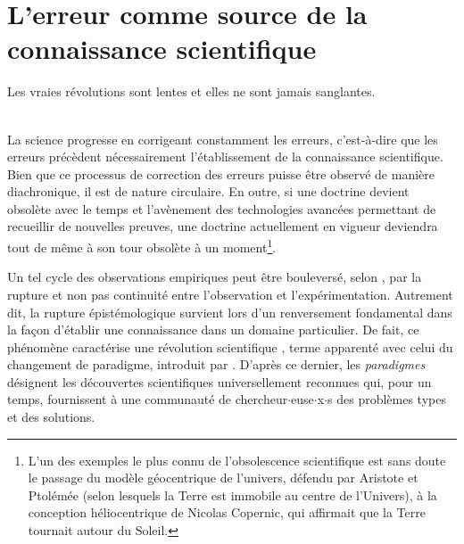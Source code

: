 \section{L'erreur comme source de la connaissance scientifique}
\begin{myepigraph}
\og{}Les vraies révolutions sont lentes et elles ne sont jamais sanglantes.\fg{}\\[-1ex]
\\ 
\end{myepigraph}
\medskip
La science progresse en corrigeant constamment les erreurs, c'est-à-dire que les erreurs précèdent nécessairement l'établissement de la connaissance scientifique. Bien que ce processus de correction des erreurs puisse être observé de manière diachronique, il est de nature circulaire. En outre, si une doctrine devient obsolète avec le temps et l'avènement des technologies avancées permettant de recueillir de nouvelles preuves, une doctrine actuellement en vigueur deviendra tout de même à son tour obsolète à un moment\footnote{L'un des exemples le plus connu de l'obsolescence scientifique est sans doute le passage du modèle géocentrique de l'univers, défendu par Aristote et Ptolémée (selon lesquels la Terre est immobile au centre de l'Univers), à la conception héliocentrique de Nicolas Copernic, qui affirmait que la Terre tournait autour du Soleil.}.


Un tel cycle des observations empiriques peut être bouleversé, selon \citet[p. 26]{bachelard1934formation}, par la \og{}rupture et non pas continuité entre l'observation et l'expérimentation\fg{}. Autrement dit, la rupture épistémologique survient lors d'un renversement fondamental dans la façon d'établir une connaissance dans un domaine particulier. De fait, ce phénomène caractérise une \og{}révolution scientifique\fg{} \citep{koyre1957closed}, terme apparenté avec celui du \og{}changement de paradigme\fg{}, introduit par \citet{kuhn1962structure}. D'après ce dernier, les \textit{paradigmes} désignent les \og{}découvertes scientifiques universellement reconnues qui, pour un temps, fournissent à une communauté de chercheur$\cdot$euse$\cdot$x$\cdot$s des problèmes types et des solutions\fg{}. 

